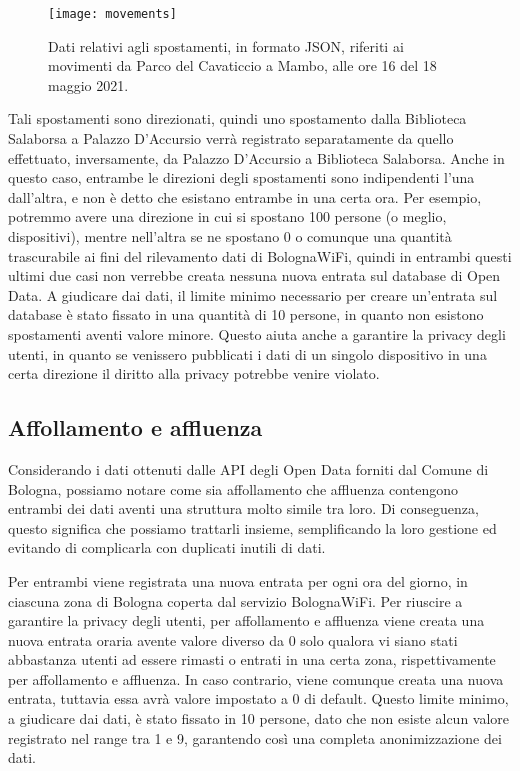 \begin{figure}[H]
    \centering
    \texttt{[image: movements]}
    \caption[Struttura dei dati sugli spostamenti]{Dati relativi agli spostamenti, in formato JSON, riferiti ai movimenti da Parco del Cavaticcio a Mambo, alle ore 16 del 18 maggio 2021.}
    \label{fig:movements}
\end{figure}

Tali spostamenti sono direzionati, quindi uno spostamento dalla Biblioteca Salaborsa a Palazzo D'Accursio verrà registrato separatamente da quello effettuato, inversamente, da Palazzo D'Accursio a Biblioteca Salaborsa. Anche in questo caso, entrambe le direzioni degli spostamenti sono indipendenti l'una dall'altra, e non è detto che esistano entrambe in una certa ora. Per esempio, potremmo avere una direzione in cui si spostano 100 persone (o meglio, dispositivi), mentre nell'altra se ne spostano 0 o comunque una quantità trascurabile ai fini del rilevamento dati di BolognaWiFi, quindi in entrambi questi ultimi due casi non verrebbe creata nessuna nuova entrata sul database di Open Data. A giudicare dai dati, il limite minimo necessario per creare un'entrata sul database è stato fissato in una quantità di 10 persone, in quanto non esistono spostamenti aventi valore minore. Questo aiuta anche a garantire la privacy degli utenti, in quanto se venissero pubblicati i dati di un singolo dispositivo in una certa direzione il diritto alla privacy potrebbe venire violato.

\subsection{Affollamento e affluenza}
Considerando i dati ottenuti dalle API degli Open Data forniti dal Comune di Bologna, possiamo notare come sia affollamento che affluenza contengono entrambi dei dati aventi una struttura molto simile tra loro. Di conseguenza, questo significa che possiamo trattarli insieme, semplificando la loro gestione ed evitando di complicarla con duplicati inutili di dati.

Per entrambi viene registrata una nuova entrata per ogni ora del giorno, in ciascuna zona di Bologna coperta dal servizio BolognaWiFi. Per riuscire a garantire la privacy degli utenti, per affollamento e affluenza viene creata una nuova entrata oraria avente valore diverso da 0 solo qualora vi siano stati abbastanza utenti ad essere rimasti o entrati in una certa zona, rispettivamente per affollamento e affluenza. In caso contrario, viene comunque creata una nuova entrata, tuttavia essa avrà valore impostato a 0 di default. Questo limite minimo, a giudicare dai dati, è stato fissato in 10 persone, dato che non esiste alcun valore registrato nel range tra 1 e 9, garantendo così una completa anonimizzazione dei dati.

